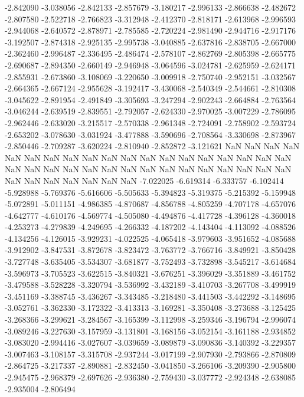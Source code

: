 -2.842090
-3.038056
-2.842133
-2.857679
-3.180217
-2.996133
-2.866638
-2.482672
-2.807580
-2.522718
-2.766823
-3.312948
-2.412370
-2.818171
-2.613968
-2.996593
-2.944068
-2.640572
-2.878971
-2.785585
-2.720224
-2.981490
-2.944716
-2.917176
-3.192507
-2.874318
-2.925135
-2.995738
-3.040885
-2.637816
-2.838705
-2.667000
-2.362460
-2.996487
-2.336495
-2.486474
-2.578107
-2.862769
-2.805398
-2.665775
-2.690687
-2.894350
-2.660149
-2.946948
-3.064596
-3.024781
-2.625959
-2.624171
-2.855931
-2.673860
-3.108069
-3.220650
-3.009918
-2.750740
-2.952151
-3.032567
-2.664365
-2.667124
-2.955628
-3.192417
-3.430068
-2.540349
-2.544661
-2.810308
-3.045622
-2.891954
-2.491849
-3.305693
-3.247294
-2.902243
-2.664884
-2.763564
-3.046244
-2.639519
-2.839551
-2.792057
-2.624330
-2.970025
-3.007229
-2.786095
-2.962446
-2.633020
-3.215517
-2.570338
-2.961348
-2.724091
-2.758902
-2.593724
-2.653202
-3.078630
-3.031924
-3.477888
-3.590696
-2.708564
-3.330698
-2.873967
-2.850446
-2.709287
-3.620224
-2.810940
-2.852872
-3.121621
NaN
NaN
NaN
NaN
NaN
NaN
NaN
NaN
NaN
NaN
NaN
NaN
NaN
NaN
NaN
NaN
NaN
NaN
NaN
NaN
NaN
NaN
NaN
NaN
NaN
NaN
NaN
NaN
NaN
NaN
NaN
NaN
NaN
NaN
NaN
NaN
NaN
NaN
NaN
NaN
NaN
-7.022025
-6.619314
-6.333757
-6.102414
-5.928988
-5.769376
-5.616606
-5.505633
-5.394823
-5.319375
-5.215392
-5.159948
-5.072891
-5.011151
-4.986385
-4.870687
-4.856788
-4.805259
-4.707178
-4.657076
-4.642777
-4.610176
-4.569774
-4.505080
-4.494876
-4.417728
-4.396128
-4.360018
-4.253273
-4.279839
-4.249695
-4.266332
-4.187202
-4.143404
-4.113092
-4.088526
-4.134256
-4.126015
-3.929231
-4.022525
-4.065418
-3.979603
-3.951652
-4.085688
-3.912902
-3.847531
-3.872678
-3.823472
-3.763772
-3.766716
-3.849921
-3.850428
-3.727748
-3.635405
-3.534307
-3.681877
-3.752493
-3.732898
-3.545217
-3.614684
-3.596973
-3.705523
-3.622515
-3.840321
-3.676251
-3.396029
-3.351889
-3.461752
-3.479588
-3.528228
-3.320794
-3.536992
-3.432189
-3.410703
-3.267708
-3.499919
-3.451169
-3.388745
-3.436267
-3.343485
-3.218480
-3.441503
-3.442292
-3.148695
-3.052761
-3.362330
-3.172322
-3.413313
-3.169281
-3.350408
-3.273688
-3.125425
-3.268366
-3.299621
-3.284567
-3.165399
-3.112998
-3.259346
-3.196794
-2.996074
-3.089246
-3.227630
-3.157959
-3.131801
-3.168156
-3.052154
-3.161188
-2.934852
-3.083020
-2.994416
-3.027607
-3.039659
-3.089879
-3.090836
-3.140392
-3.229357
-3.007463
-3.108157
-3.315708
-2.937244
-3.017199
-2.907930
-2.793866
-2.870809
-2.864725
-3.217337
-2.890881
-2.832450
-3.041850
-3.266106
-3.209390
-2.905800
-2.945475
-2.968379
-2.697626
-2.936380
-2.759430
-3.037772
-2.924348
-2.638085
-2.935004
-2.806494

